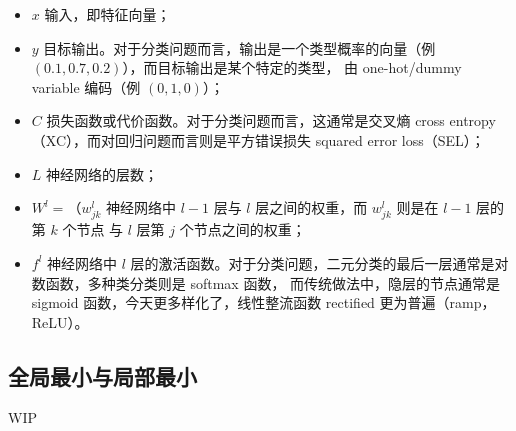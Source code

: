 \documentclass[../studies-ml.tex]{subfiles}
\begin{document}
\begin{itemize}
  \item $x$ 输入，即特征向量；
  \item $y$ 目标输出。对于分类问题而言，输出是一个类型概率的向量（例 $(0.1, 0.7, 0.2)$），而目标输出是某个特定的类型，
        由 one-hot/dummy variable 编码（例 $(0, 1, 0)$）；
  \item $C$ 损失函数或代价函数。对于分类问题而言，这通常是交叉熵 cross entropy（XC），而对回归问题而言则是平方错误损失
        squared error loss（SEL）；
  \item $L$ 神经网络的层数；
  \item $W^l = （w_{jk}^l$ 神经网络中 $l-1$ 层与 $l$ 层之间的权重，而 $w_{jk}^l$ 则是在 $l-1$ 层的第 $k$ 个节点
        与 $l$ 层第 $j$ 个节点之间的权重；
  \item $f^l$ 神经网络中 $l$ 层的激活函数。对于分类问题，二元分类的最后一层通常是对数函数，多种类分类则是 softmax 函数，
        而传统做法中，隐层的节点通常是 sigmoid 函数，今天更多样化了，线性整流函数 rectified 更为普遍（ramp，ReLU）。
\end{itemize}


\newpage
\subsection{全局最小与局部最小}

WIP
\end{document}
